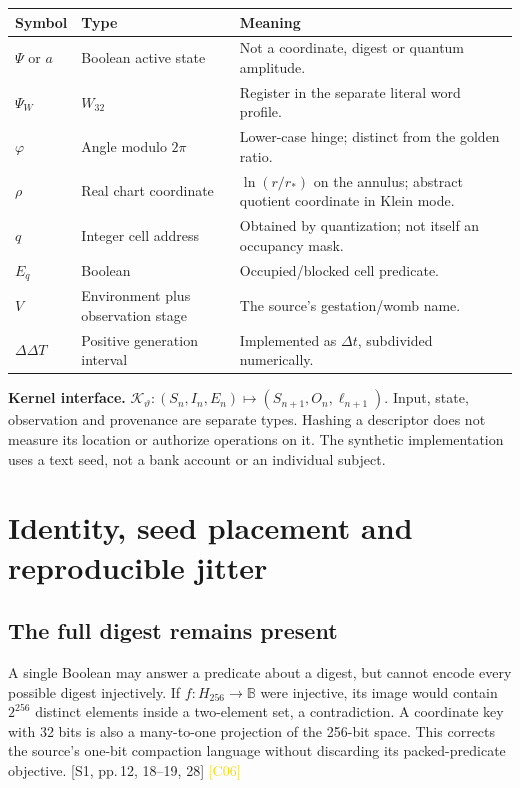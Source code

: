 \documentclass[11pt,a4paper]{article}
\newcommand{\src}[2]{\textcolor{muted}{[#1, #2]}}
\newcommand{\corr}[1]{\textcolor{gold}{\textsf{[#1]}}}
\newcommand{\ph}{\varphi}
\newcommand{\B}{\mathbb B}
\begin{document}
\small
\begin{tabularx}{\textwidth}{@{}P{25mm}P{48mm}Y@{}}
\toprule\textbf{Symbol} & \textbf{Type} & \textbf{Meaning}\\\midrule
$\Psi$ or $a$ & Boolean active state & Not a coordinate, digest or quantum amplitude.\\
$\Psi_W$ & $W_{32}$ & Register in the separate literal word profile.\\
$\ph$ & Angle modulo $2\pi$ & Lower-case hinge; distinct from the golden ratio.\\
$\rho$ & Real chart coordinate & $\ln(r/r_*)$ on the annulus; abstract quotient coordinate in Klein mode.\\
$q$ & Integer cell address & Obtained by quantization; not itself an occupancy mask.\\
$E_q$ & Boolean & Occupied/blocked cell predicate.\\
$V$ & Environment plus observation stage & The source's gestation/womb name.\\
$\Delta\Delta T$ & Positive generation interval & Implemented as $\Delta t$, subdivided numerically.\\
\bottomrule
\end{tabularx}
\normalsize

\begin{contract}
\textbf{Kernel interface.}\quad
$\mathcal K_\vartheta:(S_n,I_n,E_n)\mapsto(S_{n+1},O_n,\ell_{n+1})$.
Input, state, observation and provenance are separate types. Hashing a descriptor does not measure its location or authorize operations on it. The synthetic implementation uses a text seed, not a bank account or an individual subject.
\end{contract}
\clearpage

\section{Identity, seed placement and reproducible jitter}
\subsection{The full digest remains present}
A single Boolean may answer a predicate about a digest, but cannot encode every possible digest injectively. If $f:H_{256}\to\B$ were injective, its image would contain $2^{256}$ distinct elements inside a two-element set, a contradiction. A coordinate key with 32 bits is also a many-to-one projection of the 256-bit space. This corrects the source's one-bit compaction language without discarding its packed-predicate objective. \src{S1}{pp.\,12, 18--19, 28} \corr{C06}
\end{document}
